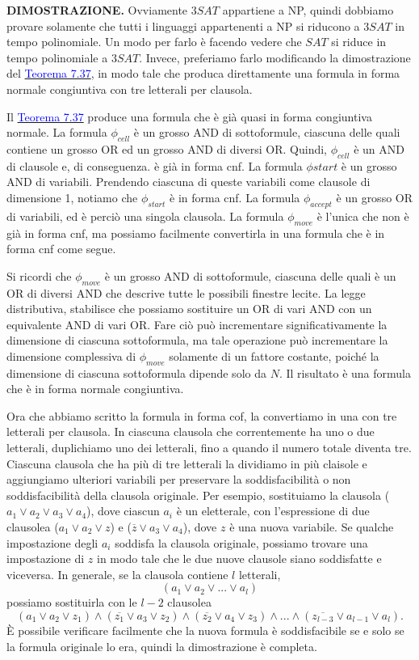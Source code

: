 \documentclass{article}
\begin{document}
\text{}
\newline
\textbf{DIMOSTRAZIONE.}
Ovviamente $3SAT$ appartiene a NP, quindi dobbiamo provare solamente che tutti i linguaggi appartenenti a NP si riducono a $3SAT$ in tempo polinomiale.
Un modo per farlo è facendo vedere che $SAT$ si riduce in tempo polinomiale a $3SAT$.
Invece, preferiamo farlo modificando la dimostrazione del \hyperref[teorema-7.37]{\textcolor{blue}{Teorema 7.37}}, in modo tale che produca direttamente una formula in forma normale congiuntiva con tre letterali per clausola.

Il \hyperref[teorema-7.37]{\textcolor{blue}{Teorema 7.37}} produce una formula che è già quasi in forma congiuntiva normale.
La formula $\phi_{cell}$ è un grosso AND di sottoformule, ciascuna delle quali contiene un grosso OR ed un grosso AND di diversi OR. 
Quindi, $\phi_{cell}$ è un AND di clausole e, di conseguenza. è già in forma cnf. 
La formula $\phi{start}$ è un grosso AND di variabili.
Prendendo ciascuna di queste variabili come clausole di dimensione 1, notiamo che $\phi_{start}$ è in forma cnf.
La formula $\phi_{accept}$ è un grosso OR di variabili, ed è perciò una singola clausola.
La formula $\phi_{move}$ è l'unica che non è già in forma cnf, ma possiamo facilmente convertirla in una formula che è in forma cnf come segue.

Si ricordi che $\phi_{move}$ è un grosso AND di sottoformule, ciascuna delle quali è un OR di diversi AND che descrive tutte le possibili finestre lecite.
La legge distributiva, stabilisce che possiamo sostituire un OR di vari AND con un equivalente AND di vari OR.
Fare ciò può incrementare significativamente la dimensione di ciascuna sottoformula, ma tale operazione può incrementare la dimensione complessiva di
$\phi_{move}$ solamente di un fattore costante, poiché la dimensione di ciascuna sottoformula dipende solo da $N$.
Il risultato è una formula che è in forma normale congiuntiva.

Ora che abbiamo scritto la formula in forma cof, la convertiamo in una con tre letterali per clausola. 
In ciascuna clausola che correntemente ha uno o due letterali, duplichiamo uno dei letterali, fino a quando il numero totale diventa tre. 
Ciascuna clausola che ha più di tre letterali la dividiamo in più claisole e aggiungiamo ulteriori variabili per preservare la soddisfacibilità o non soddisfacibilità della clausola originale.
Per esempio, sostituiamo la clausola ($a_1 \vee a_2 \vee a_3 \vee a_4$), dove ciascun $a_i$
è un eletterale, con l'espressione di due clausolea ($a_1 \vee a_2 \vee z$) e ($\overline{z} \vee a_3 \vee a_4$), dove $z$ è una nuova variabile.
Se qualche impostazione degli $a_i$ soddisfa la clausola originale, possiamo trovare una impostazione di $z$ in modo tale che le due nuove clausole siano soddisfatte e viceversa. 
In generale, se la clausola contiene $l$ letterali,
$$
(a_1 \vee a_2 \vee ... \vee a_l)
$$
possiamo sostituirla con le $l-2$ clausolea
$$
(a_1 \vee a_2 \vee z_1) \land (\overline{z_1} \vee a_3 \vee z_2) \land (\overline{z_2} \vee a_4 \vee z_3) \land ... \land (\overline{z_{l-3}} \vee a_{l-1} \vee a_l).
$$
È possibile verificare facilmente che la nuova formula è soddisfacibile se e solo se la formula originale lo era, quindi la dimostrazione è completa.
\end{document}
